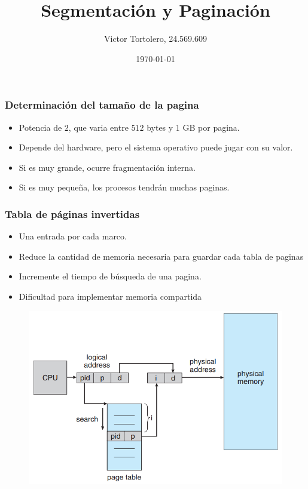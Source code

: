 \documentclass{beamer}
\title{Segmentación y Paginación}
\author{Victor Tortolero, 24.569.609}
\institute{
	Sistemas Operativos, FACYT
}
\date{\today}
\begin{document}

\begin{frame}
	\titlepage

\end{frame}
\author{}


\begin{frame}
\frametitle{Determinación del tamaño de la pagina}

\begin{itemize}
	\item Potencia de $2$, que varia entre $512$ bytes y $1$ GB por pagina.
	\item Depende del hardware, pero el sistema operativo puede jugar con su valor.
	\item Si es muy grande, ocurre fragmentación interna.
	\item Si es muy pequeña, los procesos tendrán muchas paginas.
\end{itemize}

\end{frame}


\begin{frame}
	\frametitle{Tabla de páginas invertidas}
	
	\begin{itemize}
		\footnotesize
		\item Una entrada por cada marco.
		\item Reduce la cantidad de memoria necesaria para guardar cada tabla de paginas
		\item Incremente el tiempo de búsqueda de una pagina.
		\item Dificultad para implementar memoria compartida
	\end{itemize}
	
	\begin{figure}[H]
		\centering
		\includegraphics[scale=0.3]{img/pagina_invertida.png}
	\end{figure}
\end{frame}
\end{document}
